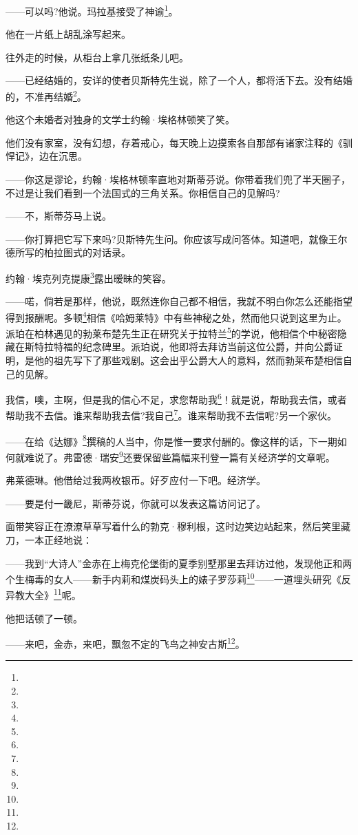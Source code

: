 \par ——可以吗?他说。玛拉基接受了神谕\footnote{}。
\par 他在一片纸上胡乱涂写起来。
\par 往外走的时候，从柜台上拿几张纸条儿吧。
\par ——已经结婚的，安详的使者贝斯特先生说，除了一个人，都将活下去。没有结婚的，不准再结婚\footnote{}。
\par 他这个未婚者对独身的文学士约翰·埃格林顿笑了笑。
\par 他们没有家室，没有幻想，存着戒心，每天晚上边摸索各自那部有诸家注释的《驯悍记》，边在沉思。
\par ——你这是谬论，约翰·埃格林顿率直地对斯蒂芬说。你带着我们兜了半天圈子，不过是让我们看到一个法国式的三角关系。你相信自己的见解吗?
\par ——不，斯蒂芬马上说。
\par ——你打算把它写下来吗?贝斯特先生问。你应该写成问答体。知道吧，就像王尔德所写的柏拉图式的对话录。
\par 约翰·埃克列克提康\footnote{}露出暧昧的笑容。
\par ——喏，倘若是那样，他说，既然连你自己都不相信，我就不明白你怎么还能指望得到报酬呢。多顿\footnote{}相信《哈姆莱特》中有些神秘之处，然而他只说到这里为止。派珀在柏林遇见的勃莱布楚先生正在研究关于拉特兰\footnote{}的学说，他相信个中秘密隐藏在斯特拉特福的纪念碑里。派珀说，他即将去拜访当前这位公爵，并向公爵证明，是他的祖先写下了那些戏剧。这会出乎公爵大人的意料，然而勃莱布楚相信自己的见解。
\par 我信，噢，主啊，但是我的信心不足，求您帮助我\footnote{}！就是说，帮助我去信，或者帮助我不去信。谁来帮助我去信?我自己\footnote{}。谁来帮助我不去信呢?另一个家伙。
\par ——在给《达娜》\footnote{}撰稿的人当中，你是惟一要求付酬的。像这样的话，下一期如何就难说了。弗雷德·瑞安\footnote{}还要保留些篇幅来刊登一篇有关经济学的文章呢。
\par 弗莱德琳。他借给过我两枚银币。好歹应付一下吧。经济学。
\par ——要是付一畿尼，斯蒂芬说，你就可以发表这篇访问记了。
\par 面带笑容正在潦潦草草写着什么的勃克·穆利根，这时边笑边站起来，然后笑里藏刀，一本正经地说：
\par ——我到“大诗人”金赤在上梅克伦堡街的夏季别墅那里去拜访过他，发现他正和两个生梅毒的女人——新手内莉和煤炭码头上的婊子罗莎莉\footnote{}——一道埋头研究《反异教大全》\footnote{}呢。
\par 他把话顿了一顿。
\par ——来吧，金赤，来吧，飘忽不定的飞鸟之神安古斯\footnote{}。
